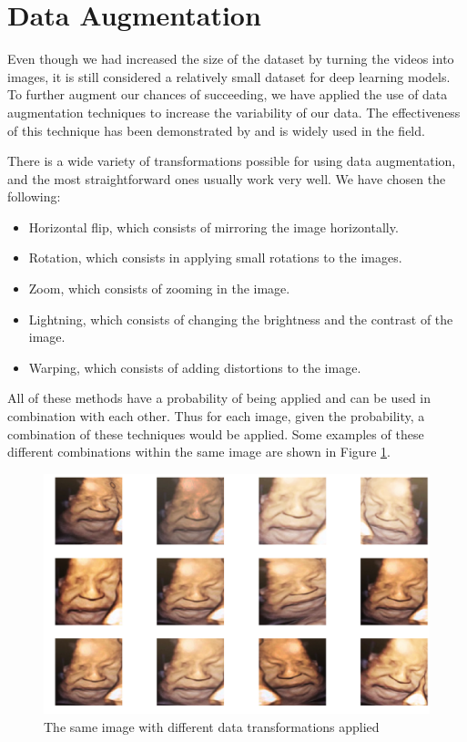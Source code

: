 \section{Data Augmentation}

Even though we had increased the size of the dataset by turning the videos into images, it is still considered a relatively small dataset for deep learning models. To further augment our chances of succeeding, we have applied the use of data augmentation techniques to increase the variability of our data. The effectiveness of this technique has been demonstrated by \cite{abs-1712-04621} and is widely used in the field.

There is a wide variety of transformations possible for using data augmentation, and the most straightforward ones usually work very well. We have chosen the following:

\begin{itemize}
    \item Horizontal flip, which consists of mirroring the image horizontally. 
    \item Rotation, which consists in applying small rotations to the images.
    \item Zoom, which consists of zooming in the image.
    \item Lightning, which consists of changing the brightness and the contrast of the image.
    \item Warping, which consists of adding distortions to the image. 
\end{itemize}

All of these methods have a probability of being applied and can be used in combination with each other. Thus for each image, given the probability, a combination of these techniques would be applied. Some examples of these different combinations within the same image are shown in Figure \ref{fig:data_augmentation}.

\begin{figure}[h!tp]
    \centering
    \includegraphics[width=.9\textwidth]{imgs/chap3_data_augmentation.png}
    \caption{The same image with different data transformations applied}
    \label{fig:data_augmentation}
\end{figure}

